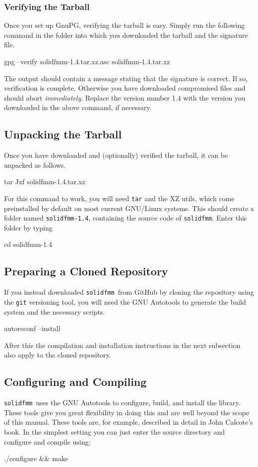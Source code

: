 \documentclass{scrbook}
\newcommand{\solidfmm}{\texttt{solidfmm}}
\begin{document}
\subsubsection{Verifying the Tarball}
Once you set up GnuPG, verifying the tarball is easy. Simply run the following
command in the folder into which you downloaded the tarball and the signature
file. 
\begin{commandshell*}
gpg --verify solidfmm-1.4.tar.xz.asc solidfmm-1.4.tar.xz
\end{commandshell*}
The output should contain a message stating that the signature is correct. If
so, verification is complete. Otherwise you have downloaded compromised files
and should abort \emph{immediately}. Replace the version number {1{.}4} with the
version you downloaded in the above command, if necessary.

\subsection{Unpacking the Tarball}
Once you have downloaded and (optionally) verified the tarball, it can be
unpacked as follows.
\begin{commandshell*}
tar Jxf solidfmm-1.4.tar.xz
\end{commandshell*}
For this command to work, you will need \lstinline|tar|\autocite{gnutar} and the
XZ utils\autocite{xzutils}, which come preinstalled by default on most current
GNU/Linux systems. This should create a folder named \lstinline|solidfmm-1.4|,
containing the source code of \solidfmm. Enter this folder by typing
\begin{commandshell*}
cd solidfmm-1.4
\end{commandshell*}

\subsection{Preparing a Cloned Repository}
If you instead  downloaded \solidfmm\ from GitHub by cloning the repository
using the \lstinline|git| versioning tool, you will need the GNU Autotools to
generate the build system and the necessary scripts.
\begin{commandshell*}
autoreconf --install
\end{commandshell*}
After this the compilation and installation instructions in the next subsection
also apply to the cloned repository.

\subsection{Configuring and Compiling}
\solidfmm\ uses the GNU Autotools to configure, build, and install the library.
These tools give you great flexibility in doing this and are well beyond the
scope of this manual. These tools are, for example, described in detail in John
Calcote's book\autocite{calcote2010}. In the simplest setting you can just
enter the source directory and configure and compile using:
\begin{commandshell*}
./configure && make
\end{commandshell*}
\end{document}
